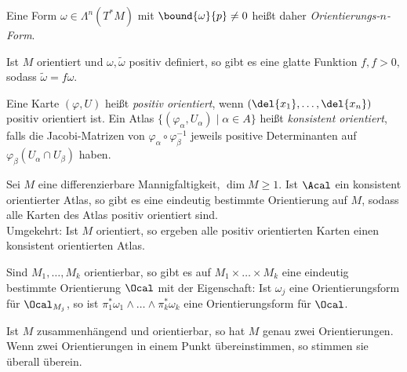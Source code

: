 \begin{rem*}
	Eine Form \( \omega \in \Lambda^n(T^*M)\) mit \( \bound{\omega}{p} \neq 0 \) heißt daher \emph{Orientierungs-$n$-Form}.
\end{rem*}

Ist $M$ orientiert und $\omega, \tilde{\omega}$ positiv definiert, so gibt es eine glatte Funktion \( f, f > 0, \) sodass \( \tilde{\omega} = f\omega \).

\begin{defn*}
	Eine Karte \( (\varphi,U) \) heißt \emph{positiv orientiert}, wenn \( (\del{x_1}, \dotsc, \del{x_n}) \) positiv orientiert ist. Ein Atlas \( \{(\varphi_\alpha, U_\alpha) \mid \alpha \in A\} \) heißt \emph{konsistent orientiert}, falls die Jacobi-Matrizen von \( \varphi_\alpha \circ \varphi_\beta^{-1} \) jeweils positive Determinanten auf \( \varphi_\beta(U_\alpha \cap U_\beta) \) haben.
\end{defn*}

\begin{lem}
	Sei $M$ eine differenzierbare Mannigfaltigkeit, $\dim M \geq 1$. Ist $\Acal$ ein konsistent orientierter Atlas, so gibt es eine eindeutig bestimmte Orientierung auf $M$, sodass alle Karten des Atlas positiv orientiert sind.\\
	Umgekehrt: Ist $M$ orientiert, so ergeben alle positiv orientierten Karten einen konsistent orientierten Atlas.
\end{lem}

\begin{lem}
	Sind \( M_1, \dotsc, M_k \) orientierbar, so gibt es auf \( M_1 \times \dots \times M_k \) eine eindeutig bestimmte Orientierung $\Ocal$ mit der Eigenschaft: Ist $\omega_j$ eine Orientierungsform für $\Ocal_{M_j}$, so ist \( \pi_1^*\omega_1 \wedge \dots \wedge \pi_k^*\omega_k \) eine Orientierungsform für $\Ocal$.
\end{lem}

\begin{lem}
	Ist $M$ zusammenhängend und orientierbar, so hat $M$ genau zwei Orientierungen. Wenn zwei Orientierungen in einem Punkt übereinstimmen, so stimmen sie überall überein.
\end{lem}